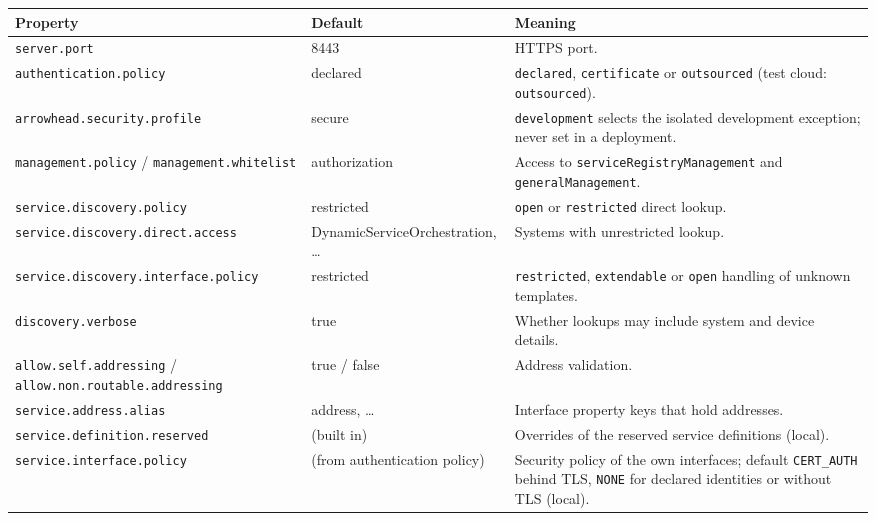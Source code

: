 \documentclass[a4paper]{arrowhead}
\begin{document}
\noindent\begin{longtable}{| p{5.4cm} | p{3.4cm} | p{6.4cm} |} \hline
\rowcolor{gray!33} Property & Default & Meaning \\ \hline \endhead
\texttt{server.\allowbreak{}port} & 8443 & HTTPS port. \\ \hline
\texttt{authentication.\allowbreak{}policy} & declared & \texttt{declared}, \texttt{certificate} or \texttt{outsourced} (test cloud: \texttt{outsourced}). \\ \hline
\texttt{arrowhead.\allowbreak{}security.\allowbreak{}profile} & secure & \texttt{development} selects the isolated development exception; never set in a deployment. \\ \hline
\texttt{management.\allowbreak{}policy} / \texttt{management.\allowbreak{}whitelist} & authorization & Access to \texttt{service\allowbreak{}Registry\allowbreak{}Management} and \texttt{generalManagement}. \\ \hline
\texttt{service.\allowbreak{}discovery.\allowbreak{}policy} & restricted & \texttt{open} or \texttt{restricted} direct lookup. \\ \hline
\texttt{service.\allowbreak{}discovery.\allowbreak{}direct.\allowbreak{}access} & Dynamic\allowbreak{}Service\allowbreak{}Orchestration, \ldots{} & Systems with unrestricted lookup. \\ \hline
\texttt{service.\allowbreak{}discovery.\allowbreak{}interface.\allowbreak{}policy} & restricted & \texttt{restricted}, \texttt{extendable} or \texttt{open} handling of unknown templates. \\ \hline
\texttt{discovery.\allowbreak{}verbose} & true & Whether lookups may include system and device details. \\ \hline
\texttt{allow.\allowbreak{}self.\allowbreak{}addressing} / \texttt{allow.\allowbreak{}non.\allowbreak{}routable.\allowbreak{}addressing} & true / false & Address validation. \\ \hline
\texttt{service.\allowbreak{}address.\allowbreak{}alias} & address, \ldots{} & Interface property keys that hold addresses. \\ \hline
\texttt{service.\allowbreak{}definition.\allowbreak{}reserved} & (built in) & Overrides of the reserved service definitions (local). \\ \hline
\texttt{service.\allowbreak{}interface.\allowbreak{}policy} & (from authentication policy) & Security policy of the own interfaces; default \texttt{CERT\_\allowbreak{}AUTH} behind TLS, \texttt{NONE} for declared identities or without TLS (local). \\ \hline

\end{longtable}
\end{document}
